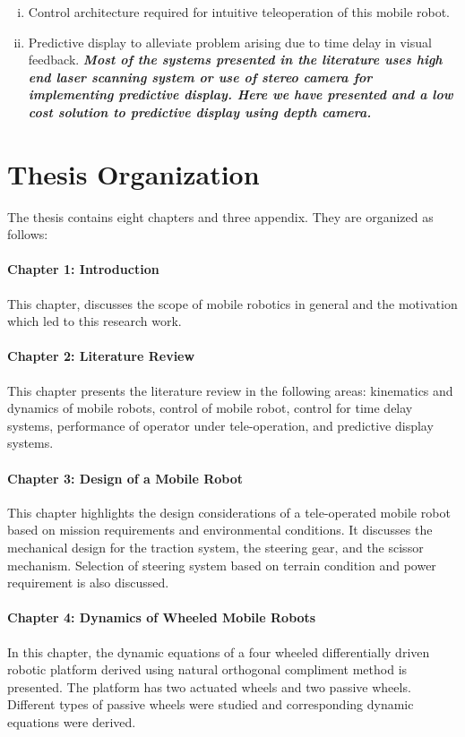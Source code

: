 \begin{enumerate}[(i)]
\item Control architecture required for intuitive teleoperation of this mobile robot. 
\item Predictive display  to alleviate problem arising due to time delay in visual feedback. \textbf{\textit{Most of the systems presented in the literature uses high end laser scanning system or use of stereo camera for implementing predictive display. Here we have presented and a low cost solution to predictive display using depth camera.}}


\end{enumerate}
\section{Thesis Organization}
The thesis contains eight chapters and three appendix. They are organized as follows:
\paragraph*{Chapter 1: Introduction\\}
This  chapter, discusses the scope of mobile robotics in general and the motivation which led to this research work.
\paragraph*{Chapter 2: Literature Review\\}
This chapter presents the literature review in the following areas: kinematics and dynamics of mobile robots, control of mobile robot, control for time delay systems, performance of operator under tele-operation,  and predictive display systems.

\paragraph*{Chapter 3: Design of a Mobile Robot\\}
This chapter highlights the design considerations of a tele-operated mobile robot based on mission requirements and  environmental conditions.  It  discusses the mechanical design for the traction system, the steering gear, and the scissor mechanism. Selection of  steering system based on terrain condition and power requirement is also discussed.   
\paragraph*{Chapter 4: Dynamics of Wheeled Mobile Robots \\}
In this chapter, the dynamic equations of a four wheeled differentially driven robotic platform derived using natural orthogonal compliment method is presented. The platform has two actuated wheels and two passive wheels. Different types of passive wheels were studied and  corresponding dynamic equations were derived. 
